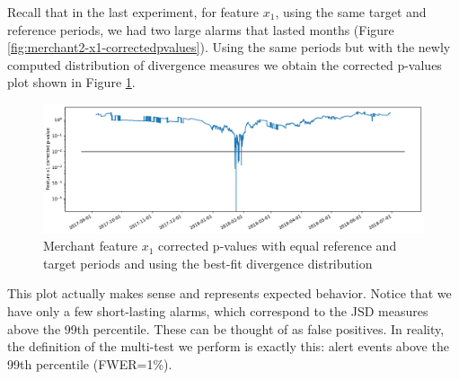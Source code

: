 Recall that in the last experiment, for feature $x_1$, using the same target and reference periods, we had two large alarms that lasted months (Figure \ref{fig:merchant2-x1-correctedpvalues}). Using the same periods but with the newly computed distribution of divergence measures we obtain the corrected p-values plot shown in Figure \ref{fig:merchant3-x1-correctedpvalues}.
\begin{figure}[!htb]
    \begin{center}
      \includegraphics[scale=0.5]{figures/merchant3-x1-correctedpvalues.pdf}
      \caption{Merchant feature $x_1$ corrected p-values with equal reference and target periods and using the best-fit divergence distribution}
      \label{fig:merchant3-x1-correctedpvalues}
    \end{center}
\end{figure}
This plot actually makes sense and represents expected behavior. Notice that we have only a few short-lasting alarms, which correspond to the JSD measures above the 99th percentile. These can be thought of as false positives. In reality, the definition of the multi-test we perform is exactly this: alert events above the 99th percentile (FWER=1\%).

